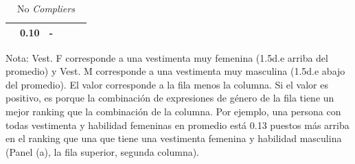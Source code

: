 \begin{table}
\begin{subtable}{\textwidth}
{\begin{tabular}{cccccc}
                                         &  0.10                &    -	                \\ \hline\hline
        \end{tabular}}
    \end{subtable}
    \begin{subtable}{\textwidth}
        \centering
        \vspace*{0.5cm}
        \caption{No \textit{Compliers}}
        \fontsize{9.5}{12}
    \end{subtable}
    \begin{threeparttable}
    \begin{tablenotes}
    \scriptsize{
    \item Nota: Vest. F corresponde a una vestimenta muy femenina (1.5d.e arriba del promedio) y Vest. M corresponde a una vestimenta muy masculina (1.5d.e abajo del promedio). El valor corresponde a la fila menos la columna. Si el valor es positivo, es porque la combinación de expresiones de género de la fila tiene un mejor ranking que la combinación de la columna. Por ejemplo, una persona con todas vestimenta y habilidad femeninas en promedio está 0.13 puestos más arriba en el ranking que una que tiene una vestimenta femenina y habilidad masculina (Panel (a), la fila superior, segunda columna).}
    \end{tablenotes}
    \end{threeparttable}
    \label{tab:hypothesis_tables}
\end{table}

